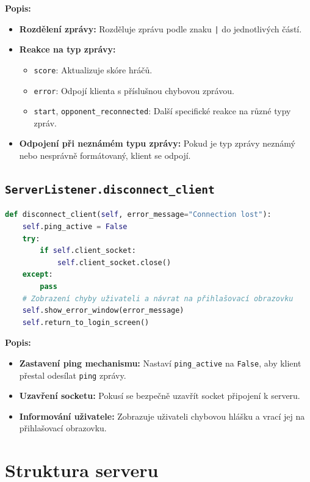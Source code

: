 \documentclass[12pt, a4paper]{article}
\begin{document}
\noindent
\textbf{Popis:}
\begin{itemize}
    \item \textbf{Rozdělení zprávy:} Rozděluje zprávu podle znaku \texttt{|} do jednotlivých částí.
    \item \textbf{Reakce na typ zprávy:}
        \begin{itemize}
            \item \texttt{score}: Aktualizuje skóre hráčů.
            \item \texttt{error}: Odpojí klienta s příslušnou chybovou zprávou.
            \item \texttt{start}, \texttt{opponent\_reconnected}: Další specifické reakce na různé typy zpráv.
        \end{itemize}
    \item \textbf{Odpojení při neznámém typu zprávy:} Pokud je typ zprávy neznámý nebo nesprávně formátovaný, klient se odpojí.
\end{itemize}

\subsection{\texttt{ServerListener.disconnect\_client}}
\begin{lstlisting}[language=Python, caption={Zajištění odpojení klienta}]
def disconnect_client(self, error_message="Connection lost"):
    self.ping_active = False
    try:
        if self.client_socket:
            self.client_socket.close()
    except:
        pass
    # Zobrazení chyby uživateli a návrat na přihlašovací obrazovku
    self.show_error_window(error_message)
    self.return_to_login_screen()
\end{lstlisting}

\noindent
\textbf{Popis:}
\begin{itemize}
    \item \textbf{Zastavení ping mechanismu:} Nastaví \texttt{ping\_active} na \texttt{False}, aby klient přestal odesílat \texttt{ping} zprávy.
    \item \textbf{Uzavření socketu:} Pokusí se bezpečně uzavřít socket připojení k serveru.
    \item \textbf{Informování uživatele:} Zobrazuje uživateli chybovou hlášku a vrací jej na přihlašovací obrazovku.
\end{itemize}

\newpage

\section{Struktura serveru}
\end{document}
